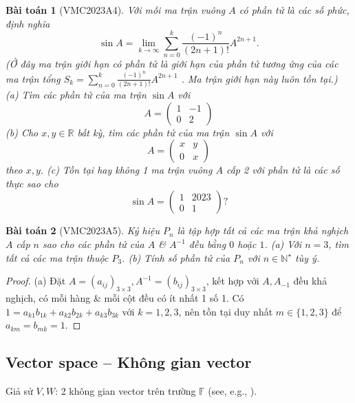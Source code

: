 \documentclass{article}
\newtheorem{baitoan}{Bài toán}
\begin{document}
\begin{baitoan}[VMC2023A4]
	Với mỗi ma trận vuông $A$ có phần tử là các số phức, định nghĩa
	\begin{equation}
		\sin A = \lim_{k\to\infty} \sum_{n=0}^k \frac{(-1)^n}{(2n + 1)!}A^{2n + 1}.
	\end{equation}
	(Ở đây ma trận giới hạn có phần tử là giới hạn của phần tử tương ứng của các ma trận tổng $S_k = \sum_{n=0}^k \frac{(-1)^n}{(2n + 1)!}A^{2n + 1}$ . Ma trận giới hạn này luôn tồn tại.) (a) Tìm các phần tử của ma trận $\sin A$ với
	\begin{equation}
		A = \begin{pmatrix}
			1 & -1\\0 & 2
		\end{pmatrix}
	\end{equation}
	(b) Cho $x,y\in\mathbb{R}$ bất kỳ, tìm các phần tử của ma trận $\sin A$ với
	\begin{equation}
		A = \begin{pmatrix}
			x & y\\0 & x
		\end{pmatrix}
	\end{equation}
	theo $x,y$. (c) Tồn tại hay không 1 ma trận vuông $A$ cấp 2 với phần tử là các số thực sao cho
	\begin{equation}
		\sin A = \begin{pmatrix}
			1 & 2023\\0 & 1
		\end{pmatrix}?
	\end{equation}
\end{baitoan}

\begin{baitoan}[VMC2023A5]
	Ký hiệu $P_n$ là tập hợp tất cả các ma trận khả nghịch $A$ cấp $n$ sao cho các phần tử của $A$ \& $A^{-1}$ đều bằng $0$ hoặc $1$. (a) Với $n = 3$, tìm tất cả các ma trận thuộc $P_3$. (b) Tính số phần tử của $P_n$ với $n\in\mathbb{N}^\star$ tùy ý.
\end{baitoan}

\begin{proof}
	(a) Đặt $A = (a_{ij})_{3\times3},A^{-1} = (b_{ij})_{3\times3}$, kết hợp với $A,A_{-1}$ đều khả nghịch, có mỗi hàng \& mỗi cột đều có ít nhất 1 số 1. Có $1 = a_{k1}b_{1k} + a_{k2}b_{2k} + a_{k3}b_{3k}$ với $k = 1,2,3$, nên tồn tại duy nhất $m\in\{1,2,3\}$ để $a_{km} = b_{mk} = 1$.
\end{proof}

\subsection{Vector space -- Không gian vector}
Giả sử $V,W$: 2 không gian vector trên trường $\mathbb{F}$ (see, e.g., \cite[Chap. 2, \S2: Ánh xạ tuyến tính, pp. 100--110]{Hung_linear_algebra}).
\end{document}
